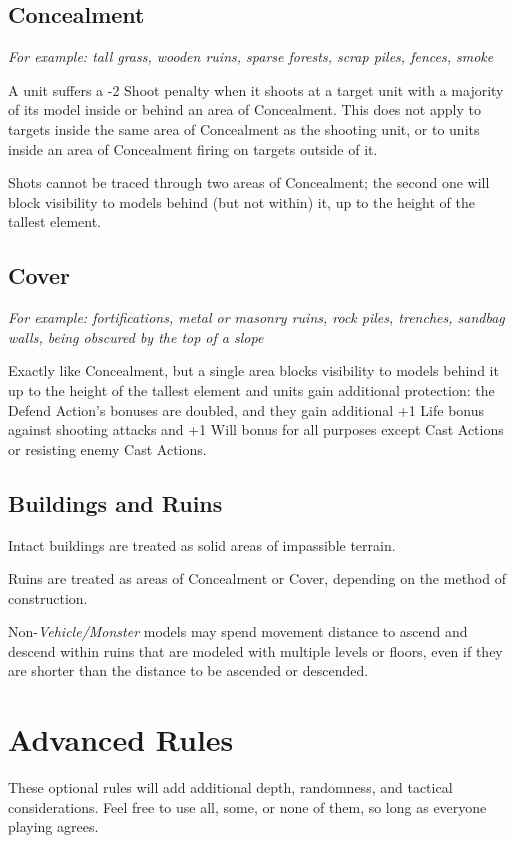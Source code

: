 \begin{multicols}{2}
\section*{Concealment}
\textit{For example: tall grass, wooden ruins, sparse forests, scrap piles, fences, smoke}

A unit suffers a -2 Shoot penalty when it shoots at a target unit with a majority of its model inside or behind an area of Concealment. This does not apply to targets inside the same area of Concealment as the shooting unit, or to units inside an area of Concealment firing on targets outside of it.

Shots cannot be traced through two areas of Concealment; the second one will block visibility to models behind (but not within) it, up to the height of the tallest element.




\section*{Cover}
\textit{For example: fortifications, metal or masonry ruins, rock piles, trenches, sandbag walls, being obscured by the top of a slope}

Exactly like Concealment, but a single area blocks visibility to models behind it up to the height of the tallest element and units gain additional protection: the Defend Action's bonuses are doubled, and they gain additional +1 Life bonus against shooting attacks and +1 Will bonus for all purposes except Cast Actions or resisting enemy Cast Actions.


\section*{Buildings and Ruins}
Intact buildings are treated as solid areas of impassible terrain.

Ruins are treated as areas of Concealment or Cover, depending on the method of construction.

Non-\textit{Vehicle/Monster} models may spend movement distance to ascend and descend within ruins that are modeled with multiple levels or floors, even if they are shorter than the distance to be ascended or descended.





\chapter*{Advanced Rules}
These optional rules will add additional depth, randomness, and tactical considerations. Feel free to use all, some, or none of them, so long as everyone playing agrees.





\end{multicols}
